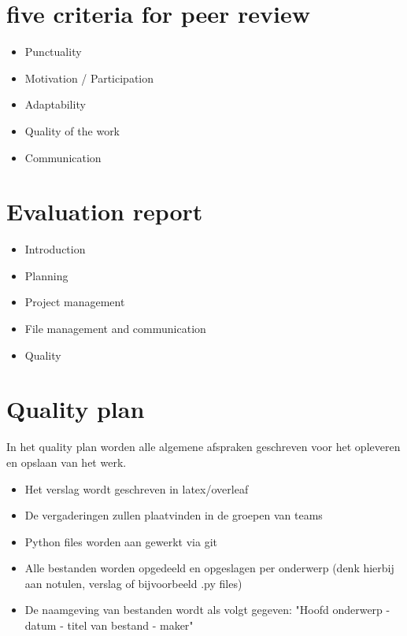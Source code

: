 \documentclass{article}
\begin{document}
\section*{five criteria for peer review}
    \begin{itemize}
       \item Punctuality
       \item Motivation / Participation
        \item Adaptability
        \item Quality of the work 
        \item Communication
    \end{itemize}


\section*{Evaluation report}
\begin{itemize}
    \item Introduction
    \item Planning
    \item Project management
    \item File management and communication
    \item Quality
\end{itemize}

\section*{Quality plan}
In het quality plan worden alle algemene afspraken geschreven voor het opleveren en opslaan van het werk.

\begin{itemize}
    \item Het verslag wordt geschreven in latex/overleaf
    \item De vergaderingen zullen plaatvinden in de groepen van teams
    \item Python files worden aan gewerkt via git
    \item Alle bestanden worden opgedeeld en opgeslagen per onderwerp (denk hierbij aan notulen, verslag of bijvoorbeeld .py files)
    \item De naamgeving van bestanden wordt als volgt gegeven: "Hoofd onderwerp - datum - titel van bestand - maker"

\end{itemize}
\end{document}
